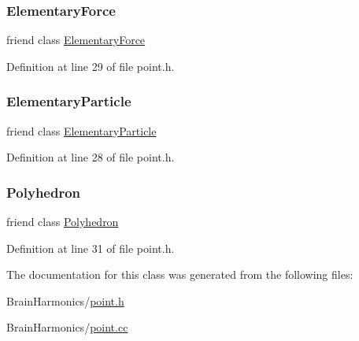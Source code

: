 \subsubsection{\texorpdfstring{Elementary\+Force}{ElementaryForce}}
{\footnotesize\ttfamily friend class \mbox{\hyperlink{class_elementary_force}{Elementary\+Force}}\hspace{0.3cm}{\ttfamily [friend]}}



Definition at line 29 of file point.\+h.

\mbox{\label{class_point_af2ace341c1d7ccd30de3502502773591}} 
\subsubsection{\texorpdfstring{Elementary\+Particle}{ElementaryParticle}}
{\footnotesize\ttfamily friend class \mbox{\hyperlink{class_elementary_particle}{Elementary\+Particle}}\hspace{0.3cm}{\ttfamily [friend]}}



Definition at line 28 of file point.\+h.

\mbox{\label{class_point_a28d1b9582890ca3e2b61dafdc1c3ba84}} 
\subsubsection{\texorpdfstring{Polyhedron}{Polyhedron}}
{\footnotesize\ttfamily friend class \mbox{\hyperlink{class_polyhedron}{Polyhedron}}\hspace{0.3cm}{\ttfamily [friend]}}



Definition at line 31 of file point.\+h.



The documentation for this class was generated from the following files\+:\begin{DoxyCompactItemize}
\item 
Brain\+Harmonics/\mbox{\hyperlink{point_8h}{point.\+h}}\item 
Brain\+Harmonics/\mbox{\hyperlink{point_8cc}{point.\+cc}}\end{DoxyCompactItemize}
